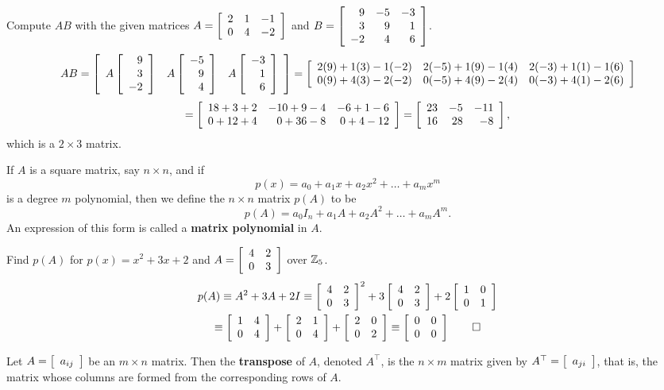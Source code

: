 \begin{Exam} Compute $AB$ with the given matrices $A = \mtx{rrr}{2&1&-1\\0&4&-2}$ and $B = \mtx{rrr}{9&-5&-3\\3&9&1\\-2&4&6}$.
\[AB = \mtx{rrr}{A\vr{9\\3\\-2} & A\vr{-5\\9\\4} & A\vr{-3\\1\\6}}= \mtx{rrr}{2(9)+1(3)-1(-2) & 2(-5)+1(9)-1(4) & 2(-3)+1(1)-1(6) \\ 0(9)+4(3)-2(-2) & 0(-5)+4(9)-2(4) & 0(-3)+4(1)-2(6)}\]\[  = \mtx{rrr}{18+3+2 & -10+9-4 & -6+1-6 \\ 0+12+4 & 0+36-8 & 0+4-12} = \mtx{rrr}{23&-5&-11\\16&28&-8},\] which is a $2\times 3$ matrix.
\end{Exam}\vs


\begin{Def} If $A$ is a square matrix, say $n\times n$, and if 
\[p(x) = a_0 + a_1x + a_2x^2 + \ldots + a_mx^m\] is a degree $m$ polynomial, then we define the $n\times n$ matrix $p(A)$ to be 
\[p(A) = a_0I_n + a_1A + a_2A^2 + \ldots + a_mA^m.\] An expression of this form is called a \textbf{matrix polynomial} in $A$.
\end{Def}\vs


\begin{Exam} Find $p(A)$ for $p(x) = x^2+3x+2$ and $A=\mtx{rr}{4&2\\0&3}$ over $\Z_5$.
\begin{multline*}
p(A) \equiv A^2+3A+2I \equiv \mtx{rr}{4&2\\0&3}^2 + 3\mtx{rr}{4&2\\0&3} + 2\mtx{rr}{1&0\\0&1}\\
\equiv \mtx{rr}{1&4\\0&4} + \mtx{rr}{2&1\\0&4} + \mtx{rr}{2&0\\0&2} \equiv \mtx{rr}{0 & 0\\0 & 0} \qedhere
\end{multline*}
\end{Exam}\vs

\begin{Def} Let $A = \mtx{r}{a_{ij}}$ be an $m\times n$ matrix. Then the \textbf{transpose} of $A$, denoted $A^\top $, is the $n\times m$ matrix given by $A^\top  = \mtx{r}{a_{ji}}$, that is, the matrix whose columns are formed from the corresponding rows of $A$.
\end{Def}\vs


